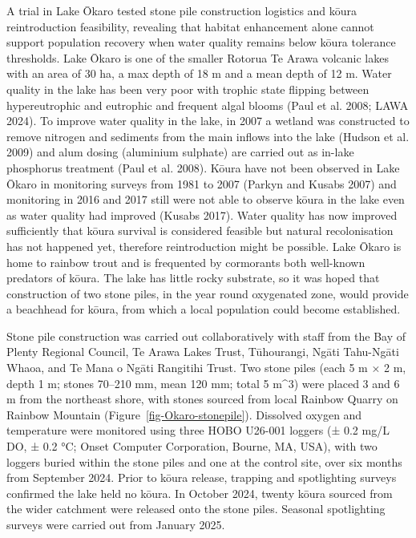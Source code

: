 \documentclass[
  12pt,
  a4paper,
  oneside]{scrbook}
\begin{document}
A trial in Lake Ōkaro tested stone pile construction logistics and kōura
reintroduction feasibility, revealing that habitat enhancement alone
cannot support population recovery when water quality remains below
kōura tolerance thresholds. Lake Ōkaro is one of the smaller Rotorua Te
Arawa volcanic lakes with an area of 30 ha, a max depth of 18 m and a
mean depth of 12 m. Water quality in the lake has been very poor with
trophic state flipping between hypereutrophic and eutrophic and frequent
algal blooms (Paul et al. 2008; LAWA 2024). To improve water quality in
the lake, in 2007 a wetland was constructed to remove nitrogen and
sediments from the main inflows into the lake (Hudson et al. 2009) and
alum dosing (aluminium sulphate) are carried out as in-lake phosphorus
treatment (Paul et al. 2008). Kōura have not been observed in Lake Ōkaro
in monitoring surveys from 1981 to 2007 (Parkyn and Kusabs 2007) and
monitoring in 2016 and 2017 still were not able to observe kōura in the
lake even as water quality had improved (Kusabs 2017). Water quality has
now improved sufficiently that kōura survival is considered feasible but
natural recolonisation has not happened yet, therefore reintroduction
might be possible. Lake Ōkaro is home to rainbow trout and is frequented
by cormorants both well-known predators of kōura. The lake has little
rocky substrate, so it was hoped that construction of two stone piles,
in the year round oxygenated zone, would provide a beachhead for kōura,
from which a local population could become established.

Stone pile construction was carried out collaboratively with staff from
the Bay of Plenty Regional Council, Te Arawa Lakes Trust, Tūhourangi,
Ngāti Tahu-Ngāti Whaoa, and Te Mana o Ngāti Rangitihi Trust. Two stone
piles (each 5 m × 2 m, depth 1 m; stones 70--210 mm, mean 120 mm; total
5 m\^{}3) were placed 3 and 6 m from the northeast shore, with stones
sourced from local Rainbow Quarry on Rainbow Mountain
(Figure~\ref{fig-Okaro-stonepile}). Dissolved oxygen and temperature
were monitored using three HOBO U26-001 loggers (± 0.2 mg/L DO, ± 0.2
°C; Onset Computer Corporation, Bourne, MA, USA), with two loggers
buried within the stone piles and one at the control site, over six
months from September 2024. Prior to kōura release, trapping and
spotlighting surveys confirmed the lake held no kōura. In October 2024,
twenty kōura sourced from the wider catchment were released onto the
stone piles. Seasonal spotlighting surveys were carried out from January
2025.
\end{document}
